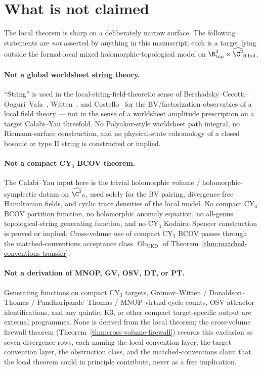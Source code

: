 \section*{What is not claimed}\label{sec:what-is-not-claimed}

The local theorem is sharp on a deliberately narrow surface.  The
following statements are \emph{not} asserted by anything in this
manuscript; each is a target lying outside the formal-local mixed
holomorphic-topological model on
\(\R^2_{\mathrm{top}}\times\widehat{\C^2}_{0,\mathrm{hol}}\).

\paragraph{Not a global worldsheet string theory.}  ``String'' is used
in the local-string-field-theoretic sense of Bershadsky--Cecotti--
Ooguri--Vafa~\cite{bcov}, Witten~\cite{witten-cs-as-string}, and
Costello~\cite{costello-bv} for the BV/factorization observables of a
local field theory --- not in the sense of a worldsheet
amplitude prescription on a target Calabi--Yau threefold.  No
Polyakov-style worldsheet path integral, no Riemann-surface
construction, and no physical-state cohomology of a closed bosonic or
type II string is constructed or implied.

\paragraph{Not a compact CY\(_3\) BCOV theorem.}  The Calabi--Yau
input here is the trivial holomorphic volume / holomorphic-symplectic
datum on \(\widehat{\C^2}_0\), used solely for the BV pairing,
divergence-free Hamiltonian fields, and cyclic trace densities of the
local model.  No compact CY\(_3\) BCOV partition function, no
holomorphic anomaly equation, no all-genus topological-string
generating function, and no CY\(_3\) Kodaira--Spencer construction is
proved or implied.  Cross-volume use of compact CY\(_3\) BCOV passes
through the matched-conventions acceptance class
\(\operatorname{Ob}_{\mathrm{UKD}}\) of
Theorem~\ref{thm:matched-conventions-transfer}.

\paragraph{Not a derivation of MNOP, GV, OSV, DT, or PT.}  Generating
functions on compact CY\(_3\) targets, Gromov--Witten / Donaldson--
Thomas / Pandharipande--Thomas / MNOP virtual-cycle counts, OSV
attractor identifications, and any quintic, K3, or other compact
target-specific output are external programmes.  None is derived from
the local theorem; the cross-volume firewall theorem
(Theorem~\ref{thm:cross-volume-firewall}) records this exclusion as
seven divergence rows, each naming the local convention layer, the
target convention layer, the obstruction class, and the
matched-conventions claim that the local theorem could in principle
contribute, never as a free implication.

